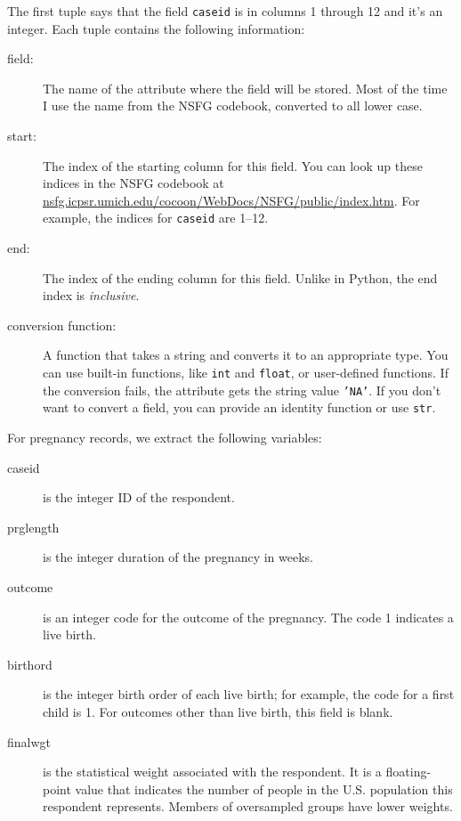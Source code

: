 \documentclass[12pt]{book}
\begin{document}
The first tuple says that the field {\tt caseid} is in columns
1 through 12 and it's an integer.  Each tuple contains the following
information:

\begin{description}

\item[field:] The name of the attribute where the field
will be stored.  Most of the time I use the name from the
NSFG codebook, converted to all lower case.

\item[start:] The index of the starting column for this
field.  You can look up these indices in the NSFG codebook
at \url{nsfg.icpsr.umich.edu/cocoon/WebDocs/NSFG/public/index.htm}.
For example, the indices for {\tt caseid} are
1--12.

\item[end:] The index of the ending column for this
field.  Unlike in Python, the end index is {\em inclusive}.

\item[conversion function:] A function that takes a string
and converts it to an appropriate type.  You can use built-in
functions, like {\tt int} and {\tt float}, or user-defined
functions.  If the conversion fails, the attribute gets the
string value {\tt 'NA'}.  If you don't want to convert a
field, you can provide an identity function or use {\tt str}.

\end{description}

For pregnancy records, we extract the following variables:

\begin{description}

\item[caseid] is the integer ID of the respondent.

\item[prglength] is the integer duration of the pregnancy in weeks.

\item[outcome] is an integer code for the outcome of the pregnancy.
The code 1 indicates a live birth.

\item[birthord] is the integer birth order of each live birth;
for example, the code for a first child is 1. 
For outcomes other than live birth, this field is blank.

\item[finalwgt] is the statistical weight associated with the respondent.
It is a floating-point value that indicates the number of people in
the U.S. population this respondent represents.  Members of oversampled
groups have lower weights.


\end{description}
\end{document}
